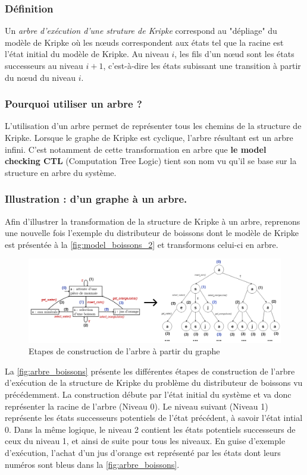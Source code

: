 \documentclass[runningheads,a4paper,10pt]{llncs}
\begin{document}
\subsubsection{Définition} 
Un \textit{arbre d'exécution d'une struture de Kripke} correspond au "dépliage" du modèle de Kripke où les n\oe uds correspondent aux états tel que la racine est l'état initial du modèle de Kripke. Au niveau $i$, les fils d'un n\oe ud sont les états successeurs au niveau $i+1$, c'est-à-dire les états subissant une transition à partir du n\oe ud du niveau $i$. 

\subsubsection{Pourquoi utiliser un arbre ?}
L'utilisation d'un arbre permet de représenter tous les chemins de la structure de Kripke. Lorsque le graphe de Kripke est cyclique, l'arbre résultant est un arbre infini. C'est notamment de cette transformation en arbre que \textbf{le model checking CTL} (Computation Tree Logic) tient son nom vu qu'il se base sur la structure en arbre du système. 

\subsubsection{Illustration : d'un graphe à un arbre.}

Afin d'illustrer la transformation de la structure de Kripke à un arbre, reprenons une nouvelle fois l'exemple du distributeur de boissons dont le modèle de Kripke est présentée à la \autoref{fig:model_boissons_2} et transformons celui-ci en arbre. 

\begin{figure}
  \centering
   \includegraphics[scale=0.37]{figures/Arbre_Distributeur_V2.png}
   \caption[Caption for LOF]{Etapes de construction de l'arbre à partir du graphe}
   \label{fig:arbre_boissons}
\end{figure}

La \autoref{fig:arbre_boissons} présente les différentes étapes de construction de l'arbre d'exécution de la structure de Kripke du problème du distributeur de boissons vu précédemment. 
La construction débute par l'état initial du système et va donc représenter la racine de l'arbre (Niveau 0). Le niveau suivant (Niveau 1) représente les états successeurs potentiels de l'état précédent, à savoir l'état intial 0. Dans la même logique, le niveau 2 contient les états potentiels successeurs de ceux du niveau 1, et ainsi de suite pour tous les niveaux. En guise d'exemple d'exécution, l'achat d'un jus d'orange est représenté par les états dont leurs numéros sont bleus dans la \autoref{fig:arbre_boissons}. \\
\end{document}
